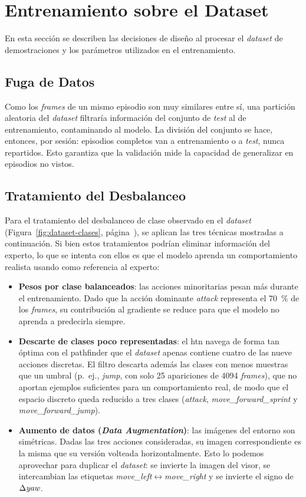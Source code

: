 \section{Entrenamiento sobre el Dataset}
En esta sección se describen las decisiones de diseño al procesar el \textit{dataset} de 
demostraciones y los parámetros utilizados en el entrenamiento.

\subsection{Fuga de Datos}
Como los \textit{frames} de un mismo episodio son muy
similares entre sí, una partición aleatoria del \textit{dataset} filtraría información
del conjunto de \textit{test} al de entrenamiento, contaminando al modelo. La
división del conjunto se hace, entonces, por sesión: episodios completos van a
entrenamiento o a \textit{test}, nunca repartidos. Esto garantiza que la validación
mide la capacidad de generalizar en episodios no vistos.

\subsection{Tratamiento del Desbalanceo}
\label{sec:desbalanceo}
Para el tratamiento del desbalanceo de clase observado en el \textit{dataset} (Figura~\ref{fig:dataset-clases}, página~\pageref{fig:dataset-clases}),
se aplican las tres técnicas mostradas a continuación. Si bien estos tratamientos podrían eliminar información del experto,
lo que se intenta con ellos es que el modelo aprenda un comportamiento realista usando como referencia al experto:

\begin{itemize}
  \item \textbf{Pesos por clase balanceados}: las acciones
  minoritarias pesan más durante el entrenamiento. Dado que la acción dominante 
  \textit{attack} representa el \qty{70}{\percent} de los \textit{frames},
  su contribución al gradiente se reduce para que el modelo no aprenda a predecirla siempre.
  \item \textbf{Descarte de clases poco representadas}: el \gls{htn}
  navega de forma tan óptima con el \gls{pathfinder} que el \textit{dataset} apenas contiene
  cuatro de las nueve acciones discretas. El filtro descarta además las clases con
  menos muestras que un umbral (p.\ ej., \textit{jump}, con solo \num{25} apariciones de \num{4094} \textit{frames}),
  que no aportan ejemplos suficientes para un comportamiento real, de modo que el
  espacio discreto queda reducido a tres clases (\textit{attack},
  \textit{move\_forward\_sprint} y \textit{move\_forward\_jump}).
  \item \textbf{Aumento de datos (\textit{Data Augmentation})}: las imágenes del entorno son simétricas. Dadas las tres acciones consideradas,
  su imagen correspondiente es la misma que su versión volteada horizontalmente. Esto lo podemos aprovechar
  para duplicar el \textit{dataset}: se invierte la imagen del visor, se intercambian
  las etiquetas \textit{move\_left}$\leftrightarrow$\textit{move\_right} y se invierte
  el signo de $\Delta\text{\textit{yaw}}$.
\end{itemize}

